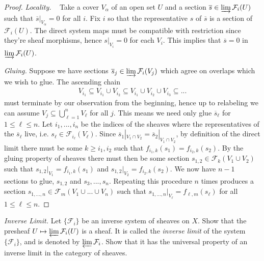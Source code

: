 \begin{problemset}
\begin{proof}
		\emph{Locality.} ~ Take a cover $V_\alpha$ of an open set $U$ and a section $\overline s\in \varinjlim \mathcal F_i(U)$ such that $\overline s|_{V_\alpha} = 0$ for all $i$. Fix $i$ so that the representative $s$ of $\overline s$ is a section of $\mathcal F_i(U)$. The direct system maps must be compatible with restriction since they're sheaf morphisms, hence $s|_{V_i} = 0$ for each $V_i$. This implies that $\overline s = 0$ in $\varinjlim \mathcal F_i(U)$. 

		\emph{Gluing.} Suppose we have sections $\overline s_j \in \varinjlim \mathcal F_i(V_j)$ which agree on overlaps which we wish to glue. The ascending chain
		\begin{align*}
			V_{i_1}\subseteq V_{i_1}\cup V_{i_2} \subseteq V_{i_1}\cup V_{i_2}\cup V_{i_3}\subseteq ...
		\end{align*}
		must terminate by our observation from the beginning, hence up to relabeling we can assume $V_j \subseteq \bigcup_{\ell = 1}^n V_\ell$ for all $j$. This means we need only glue $\overline s_{\ell}$ for $1\leq \ell \leq n$. Let $i_1,...,i_n$ be the indices of the sheaves where the representatives of the $\overline s_\ell$ live, i.e. $s_\ell \in \mathcal F_{i_\ell}(V_\ell)$. Since $\overline s_1|_{V_1\cap V_2} = \overline s_2 |_{V_1\cap V_2}$, by definition of the direct limit there must be some $k\geq i_1, i_2$ such that $f_{i_1, k}(s_1) = f_{i_2, k}(s_2)$. By the gluing property of sheaves there must then be some section $s_{1,2} \in \mathcal F_k(V_1\cup V_2)$ such that $s_{1,2}|_{V_1} = f_{i_1,k}(s_1)$ and $s_{1,2}|_{V_2} = f_{i_2,k}(s_2)$. We now have $n-1$ sections to glue, $s_{1,2}$ and $s_3,...,s_{n}$. Repeating this procedure $n$ times produces a section $s_{1,...,n} \in \mathcal F_{m}(V_1\cup ...\cup V_n)$ such that $s_{1,...,n}|_{V_\ell} = f_{\ell, m}(s_\ell)$ for all $1\leq \ell\leq n$. 
	\end{proof}
\item \emph{Inverse Limit.} Let $\{\mathcal F_i\}$ be an inverse system of sheaves on $X$. Show that the presheaf $U\mapsto \varprojlim \mathcal F_i(U)$ is a sheaf. It is called the \emph{inverse limit} of the system $\{\mathcal F_i\}$, and is denoted by $\varprojlim \mathcal F_i$. Show that it has the universal property of an inverse limit in the category of sheaves.

\end{problemset}
